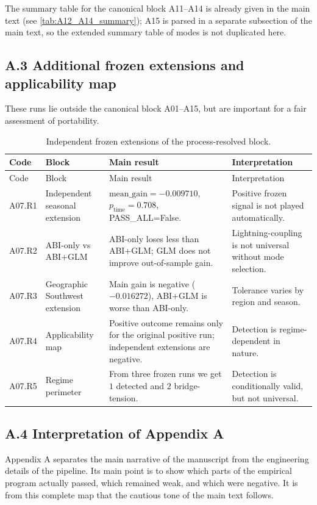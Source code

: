 \documentclass[11pt,a4paper]{article}
\theoremstyle{definition}
\theoremstyle{plain}
\theoremstyle{remark}
\begin{document}
The summary table for the canonical block A11--A14 is already given in the main text (see \cref{tab:A12_A14_summary}); A15 is parsed in a separate subsection of the main text, so the extended summary table of modes is not duplicated here.

\subsection*{A.3 Additional frozen extensions and applicability map}

These runs lie outside the canonical block A01--A15, but are important for a fair assessment of portability.

{\small
\begin{longtable}{@{}p{1.5cm}p{3.2cm}p{5.1cm}p{3.4cm}@{}}
\caption{Independent frozen extensions of the process-resolved block.}\label{tab:appendix_a_extensions}\\
\toprule
Code & Block & Main result & Interpretation \\
\midrule
\endfirsthead
\toprule
Code & Block & Main result & Interpretation \\
\midrule
\endhead
A07.R1 & Independent seasonal extension & $\mathrm{mean\_gain}=-0.009710$, $p_{\mathrm{time}}=0.708$, PASS\_ALL=False. & Positive frozen signal is not played automatically. \\
A07.R2 & ABI-only vs ABI+GLM & ABI-only loses less than ABI+GLM; GLM does not improve out-of-sample gain. & Lightning-coupling is not universal without mode selection. \\
A07.R3 & Geographic Southwest extension & Main gain is negative ($-0.016272$), ABI+GLM is worse than ABI-only. & Tolerance varies by region and season. \\
A07.R4 & Applicability map & Positive outcome remains only for the original positive run; independent extensions are negative. & Detection is regime-dependent in nature. \\
A07.R5 & Regime perimeter & From three frozen runs we get $1$ detected and $2$ bridge-tension. & Detection is conditionally valid, but not universal. \\
\bottomrule
\end{longtable}
}

\subsection*{A.4 Interpretation of Appendix A}

Appendix A separates the main narrative of the manuscript from the engineering details of the pipeline.
Its main point is to show which parts of the empirical program actually passed,
which remained weak, and which were negative.
It is from this complete map that the cautious tone of the main text follows.


\printbibliography
\end{document}
